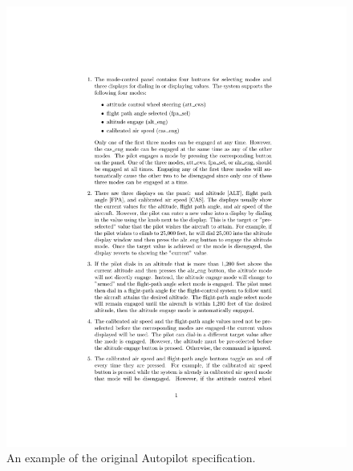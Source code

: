 \begin{figure}[H]
\centering
\begin{minipage}{0.45\textwidth}
\centering
\includegraphics[clip, trim=5.5cm 11cm 4cm 4.5cm, scale=0.6]{examples/semiform/informal.pdf}
\vspace{-0.18in}
\caption{An example of the original Autopilot specification. \label{fig:originalautopilot}}
\vspace{-0.2in}
\end{minipage}\hfill
\begin{minipage}{0.45\textwidth}
\centering

\end{minipage}
\end{figure}
